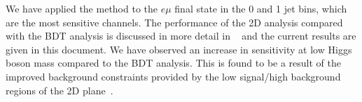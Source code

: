 We have applied the method to the $e\mu$ final state in the 0 and 1 jet bins, 
which are the most sensitive channels.  The performance of the 2D analysis
compared with the BDT analysis is discussed in more detail
in ~\cite{2DNote} and the current results are given 
in this document.  We have observed an increase in sensitivity
at low Higgs boson mass compared to the BDT analysis. 
This is found to be a result of the improved background
constraints provided by the low signal/high background regions
of the 2D plane~\cite{YY2DTalk}.

